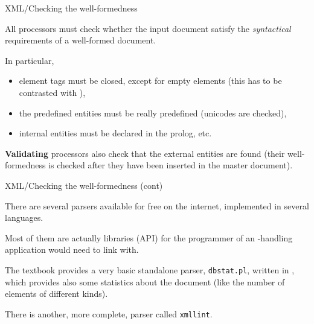 %
\begin{frame}{XML/Checking the well-formedness}
\label{well_formedness}

All \XML processors must check whether the input document satisfy the
\emph{syntactical} requirements of a well-formed \XML document.

\bigskip

In particular,
\begin{itemize}

  \item element tags must be closed, except for empty elements (this
    has to be contrasted with \HTML),

  \item the predefined entities must be really predefined (unicodes
    are checked),

  \item internal entities must be declared in the prolog, etc.

\end{itemize}
\textbf{Validating} processors also check that the external entities
are found (their well-formedness is checked after they have been
inserted in the master document).

\end{frame}

%
\begin{frame}{XML/Checking the well-formedness (cont)}

There are several \XML parsers available for free on the internet,
implemented in several languages.

\bigskip

Most of them are actually libraries (API) for the programmer of an
\XML-handling application would need to link with.

\bigskip

The textbook provides a very basic standalone parser,
\texttt{dbstat.pl}, written in \Perl, which provides also some
statistics about the document (like the number of elements of
different kinds).

\bigskip

There is another, more complete, parser called \texttt{xmllint}.

\end{frame}
